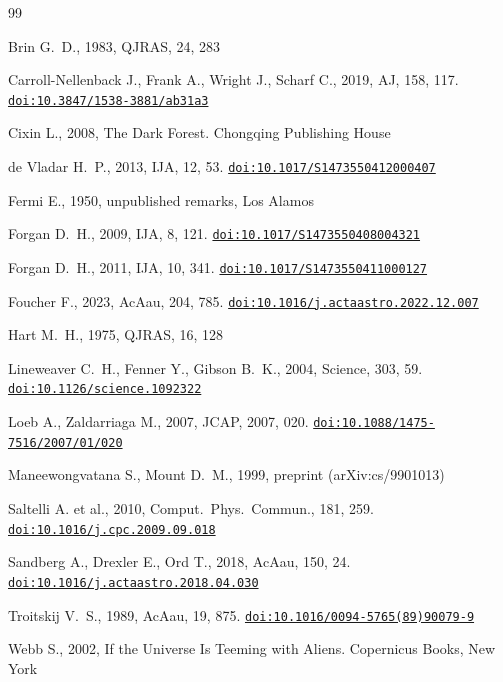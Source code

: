 \documentclass[useAMS,usenatbib]{mn2e}
\newcommand{\doi}[1]{\href{https://doi.org/#1}{\nolinkurl{doi:#1}}}
\begin{document}
\begin{thebibliography}{99}

Brin G.~D., 1983, QJRAS, 24, 283

Carroll-Nellenback J., Frank A., Wright J., Scharf C., 2019, AJ, 158, 117.
\newblock \doi{10.3847/1538-3881/ab31a3}

Cixin L., 2008, The Dark Forest. Chongqing Publishing House

de Vladar H.~P., 2013, IJA, 12, 53.
\newblock \doi{10.1017/S1473550412000407}

Fermi E., 1950, unpublished remarks, Los Alamos

Forgan D.~H., 2009, IJA, 8, 121.
\newblock \doi{10.1017/S1473550408004321}

Forgan D.~H., 2011, IJA, 10, 341.
\newblock \doi{10.1017/S1473550411000127}

Foucher F., 2023, AcAau, 204, 785.
\newblock \doi{10.1016/j.actaastro.2022.12.007}

Hart M.~H., 1975, QJRAS, 16, 128

Lineweaver C.~H., Fenner Y., Gibson B.~K., 2004, Science, 303, 59.
\newblock \doi{10.1126/science.1092322}

Loeb A., Zaldarriaga M., 2007, JCAP, 2007, 020.
\newblock \doi{10.1088/1475-7516/2007/01/020}

Maneewongvatana S., Mount D.~M., 1999, preprint (arXiv:cs/9901013)

Saltelli A. et al., 2010, Comput.~Phys.~Commun., 181, 259.
\newblock \doi{10.1016/j.cpc.2009.09.018}

Sandberg A., Drexler E., Ord T., 2018, AcAau, 150, 24.
\newblock \doi{10.1016/j.actaastro.2018.04.030}

Troitskij V.~S., 1989, AcAau, 19, 875.
\newblock \doi{10.1016/0094-5765(89)90079-9}

Webb S., 2002, If the Universe Is Teeming with Aliens. Copernicus Books, New York

\end{thebibliography}
\end{document}
